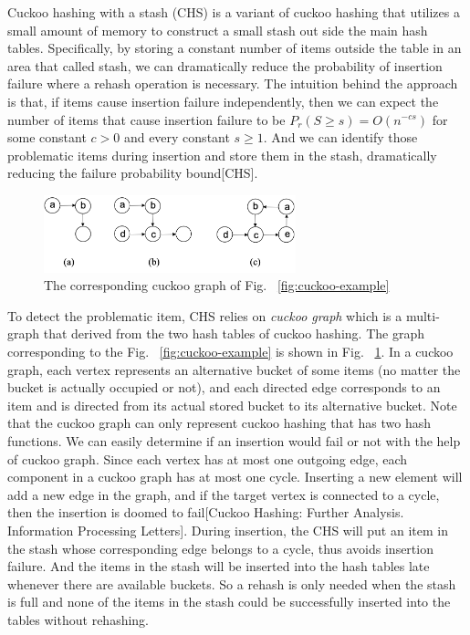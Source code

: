 \documentclass[runningheads]{llncs}
\begin{document}
Cuckoo hashing with a stash (CHS) is a variant of cuckoo hashing that utilizes a small amount of memory to construct a small stash out side the main hash tables. Specifically, by storing a constant number of items outside the table in an area that called stash, we can dramatically reduce the probability of insertion failure where a rehash operation is necessary. The intuition behind the approach is that, if items cause insertion failure independently, then we can expect the number of items that cause insertion failure to be $P_r(S\geq s)=O(n^{-cs})$ for some constant $c>0$ and every constant $s\geq 1$. And we can identify those problematic items during insertion and store them in the stash, dramatically reducing the failure probability bound[CHS].

\begin{figure}
    \centering
    \includegraphics[width=0.65\textwidth]{cuckoo-graph.png}
    \caption{The corresponding cuckoo graph of Fig. ~\ref{fig:cuckoo-example}
    } \label{fig:cuckoo-graph}
\end{figure}

To detect the problematic item, CHS relies on \textit{cuckoo graph} which is a multi-graph that derived from the two hash tables of cuckoo hashing. The graph corresponding to the Fig. ~\ref{fig:cuckoo-example} is shown in Fig. ~\ref{fig:cuckoo-graph}. In a cuckoo graph, each vertex represents an alternative bucket of some items (no matter the bucket is actually occupied or not), and each directed edge corresponds to an item and is directed from its actual stored bucket to its alternative bucket. Note that the cuckoo graph can only represent cuckoo hashing that has two hash functions. We can easily determine if an insertion would fail or not with the help of cuckoo graph. Since each vertex has at most one outgoing edge, each component in a cuckoo graph has at most one cycle. Inserting a new element will add a new edge in the graph, and if the target vertex is connected to a cycle, then the insertion is doomed to fail[Cuckoo Hashing: Further Analysis. Information Processing Letters]. During insertion, the CHS will put an item in the stash whose corresponding edge belongs to a cycle, thus avoids insertion failure. And the items in the stash will be inserted into the hash tables late whenever there are available buckets. So a rehash is only needed when the stash is full and none of the items in the stash could be successfully inserted into the tables without rehashing.
\end{document}
